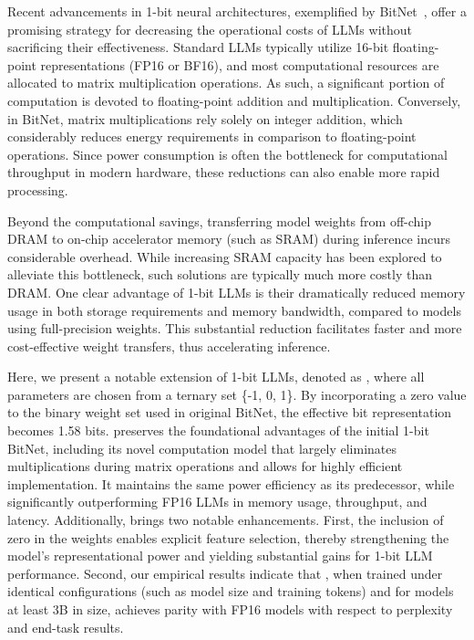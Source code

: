 Recent advancements in 1-bit neural architectures, exemplified by BitNet~\cite{bitnet}, offer a promising strategy for decreasing the operational costs of LLMs without sacrificing their effectiveness. Standard LLMs typically utilize 16-bit floating-point representations (FP16 or BF16), and most computational resources are allocated to matrix multiplication operations. As such, a significant portion of computation is devoted to floating-point addition and multiplication. Conversely, in BitNet, matrix multiplications rely solely on integer addition, which considerably reduces energy requirements in comparison to floating-point operations. Since power consumption is often the bottleneck for computational throughput in modern hardware, these reductions can also enable more rapid processing.

Beyond the computational savings, transferring model weights from off-chip DRAM to on-chip accelerator memory (such as SRAM) during inference incurs considerable overhead. While increasing SRAM capacity has been explored to alleviate this bottleneck, such solutions are typically much more costly than DRAM. One clear advantage of 1-bit LLMs is their dramatically reduced memory usage in both storage requirements and memory bandwidth, compared to models using full-precision weights. This substantial reduction facilitates faster and more cost-effective weight transfers, thus accelerating inference.

Here, we present a notable extension of 1-bit LLMs, denoted as \textbf{}, where all parameters are chosen from a ternary set \{-1, 0, 1\}. By incorporating a zero value to the binary weight set used in original BitNet, the effective bit representation becomes 1.58 bits.  preserves the foundational advantages of the initial 1-bit BitNet, including its novel computation model that largely eliminates multiplications during matrix operations and allows for highly efficient implementation. It maintains the same power efficiency as its predecessor, while significantly outperforming FP16 LLMs in memory usage, throughput, and latency. Additionally,  brings two notable enhancements. First, the inclusion of zero in the weights enables explicit feature selection, thereby strengthening the model’s representational power and yielding substantial gains for 1-bit LLM performance. Second, our empirical results indicate that , when trained under identical configurations (such as model size and training tokens) and for models at least 3B in size, achieves parity with FP16 models with respect to perplexity and end-task results.

